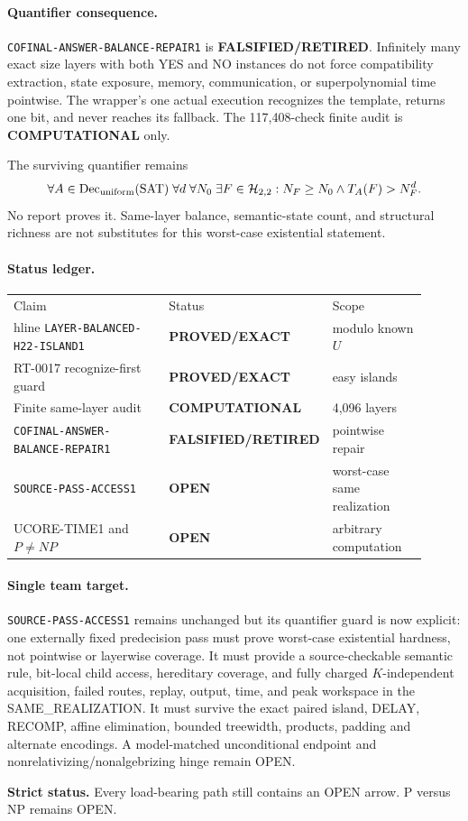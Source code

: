 \documentclass[11pt]{article}
\begin{document}
\paragraph{Quantifier consequence.}
\texttt{COFINAL-ANSWER-BALANCE-REPAIR1} is
\textbf{FALSIFIED/RETIRED}.  Infinitely many exact size layers with both YES
and NO instances do not force compatibility extraction, state exposure,
memory, communication, or superpolynomial time pointwise.  The wrapper's one
actual execution recognizes the template, returns one bit, and never reaches
its fallback.  The 117,408-check finite audit is \textbf{COMPUTATIONAL} only.

The surviving quantifier remains
\[
 \forall A\in\operatorname{Dec}_{\rm uniform}(\mathrm{SAT})\;
 \forall d\;\forall N_0\;\exists F\in\mathcal H_{2,2}:
 N_F\ge N_0\land T_A(F)>N_F^d.
\]
No report proves it.  Same-layer balance, semantic-state count, and structural
richness are not substitutes for this worst-case existential statement.

\paragraph{Status ledger.}
\begin{center}\small
\begin{tabular}{p{0.45\linewidth}p{0.22\linewidth}p{0.24\linewidth}}
\hline
Claim & Status & Scope \\hline
\texttt{LAYER-BALANCED-H22-ISLAND1} & \textbf{PROVED/EXACT} & modulo known $U$ \\
RT-0017 recognize-first guard & \textbf{PROVED/EXACT} & easy islands \\
Finite same-layer audit & \textbf{COMPUTATIONAL} & 4,096 layers \\
\texttt{COFINAL-ANSWER-BALANCE-REPAIR1} & \textbf{FALSIFIED/RETIRED} & pointwise repair \\
\texttt{SOURCE-PASS-ACCESS1} & \textbf{OPEN} & worst-case same realization \\
UCORE-TIME1 and $P\ne NP$ & \textbf{OPEN} & arbitrary computation \\\hline
\end{tabular}
\end{center}

\paragraph{Single team target.}
\texttt{SOURCE-PASS-ACCESS1} remains unchanged but its quantifier guard is
now explicit: one externally fixed predecision pass must prove worst-case
existential hardness, not pointwise or layerwise coverage.  It must provide a
source-checkable semantic rule, bit-local child access, hereditary coverage,
and fully charged $K$-independent acquisition, failed routes, replay, output,
time, and peak workspace in the SAME\_REALIZATION.  It must survive the exact
paired island, DELAY, RECOMP, affine elimination, bounded treewidth, products,
padding and alternate encodings.  A model-matched unconditional endpoint and
nonrelativizing/nonalgebrizing hinge remain OPEN.

\textbf{Strict status.} Every load-bearing path still contains an OPEN arrow.
P versus NP remains OPEN.

\end{document}
